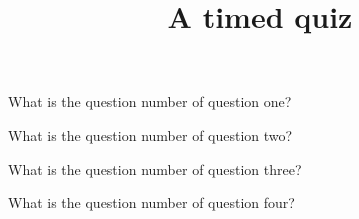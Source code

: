 \documentclass[timed=1]{webquiz}
\title{A timed quiz}
\begin{document}
  \begin{question}What is the question number of question one?
  \end{question}
  \begin{question}What is the question number of question two?
  \end{question}
  \begin{question}What is the question number of question three?
  \end{question}
  \begin{question}What is the question number of question four?
  \end{question}
\end{document}
